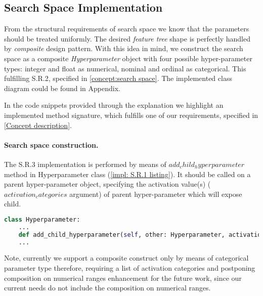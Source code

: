 \subsection{Search Space Implementation}\label{impl: search space impl}
From the structural requirements of search space we know that the parameters should be treated uniformly. The desired \emph{feature tree} shape is perfectly handled by \emph{composite} design pattern. With this idea in mind, we construct the search space as a composite \emph{Hyperparameter} object with four possible hyper-parameter types: integer and float as numerical, nominal and ordinal as categorical. This fulfilling S.R.2, specified in \cref{concept:search space}. The implemented class diagram could be found in Appendix.

In the code snippets provided through the explanation we highlight an implemented method  signature, which fulfills one of our requirements, specified in \cref{Concept description}.

\paragraph{Search space construction.} The S.R.3 implementation is performed by means of $add_child_hyperparameter$ method in Hyperparameter class (\cref{impl: S.R.1 listing}). It should be called on a parent hyper-parameter object, specifying the activation value(s) ($activation_categories$ argument) of parent hyper-parameter which will expose child. 

\begin{lstlisting}[language=Python, caption=S.R.1 implementation., label=impl: S.R.1 listing]
class Hyperparameter:
	...
	def add_child_hyperparameter(self, other: Hyperparameter, activation_categories: Iterable[_CATEGORY]) -> Hyperparameter: pass
	...
\end{lstlisting}

Note, currently we support a composite construct only by means of categorical parameter type therefore, requiring a list of activation categories and postponing composition on numerical ranges enhancement for the future work, since our current needs do not include the composition on numerical ranges.

